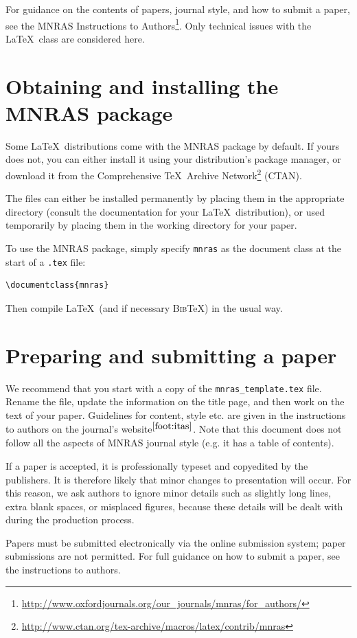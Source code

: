 \documentclass[a4paper,fleqn,usenatbib,useAMS]{mnras}
\newcommand{\bibtex}{\textsc{Bib}\!\TeX} %
\begin{document}
For guidance on the contents of papers, journal style, and how to submit a paper, see the MNRAS Instructions to Authors\footnote{\label{foot:itas}\url{http://www.oxfordjournals.org/our_journals/mnras/for_authors/}}.
Only technical issues with the \LaTeX\ class are considered here.


\section{Obtaining and installing the MNRAS package}
Some \LaTeX\ distributions come with the MNRAS package by default.
If yours does not, you can either install it using your distribution's package manager, or download it from the Comprehensive \TeX\ Archive Network\footnote{\url{http://www.ctan.org/tex-archive/macros/latex/contrib/mnras}} (CTAN).

The files can either be installed permanently by placing them in the appropriate directory (consult the documentation for your \LaTeX\ distribution), or used temporarily by placing them in the working directory for your paper.

To use the MNRAS package, simply specify \verb'mnras' as the document class at the start of a \verb'.tex' file:

\begin{verbatim}
\documentclass{mnras}
\end{verbatim}
Then compile \LaTeX\ (and if necessary \bibtex) in the usual way.

\section{Preparing and submitting a paper}
We recommend that you start with a copy of the \texttt{mnras\_template.tex} file.
Rename the file, update the information on the title page, and then work on the text of your paper.
Guidelines for content, style etc. are given in the instructions to authors on the journal's website$^{\ref{foot:itas}}$.
Note that this document does not follow all the aspects of MNRAS journal style (e.g. it has a table of contents).

If a paper is accepted, it is professionally typeset and copyedited by the publishers.
It is therefore likely that minor changes to presentation will occur.
For this reason, we ask authors to ignore minor details such as slightly long lines, extra blank spaces, or misplaced figures, because these details will be dealt with during the production process.

Papers must be submitted electronically via the online submission system; paper submissions are not permitted.
For full guidance on how to submit a paper, see the instructions to authors.
\end{document}
